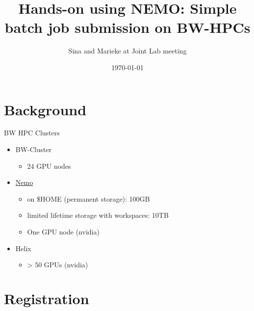 \documentclass{beamer}
\title[Joint lab meeting]{Hands-on using NEMO: Simple batch job submission on BW-HPCs}
\author{Sina and Marieke at Joint Lab meeting}
\date{\today}
\begin{document}
\begin{frame}
  \titlepage
\end{frame}

\section{Background}

\begin{frame}{BW HPC Clusters}

\begin{itemize}
  \item BW-Cluster
  \begin{itemize}
      \item 24 GPU nodes
  \end{itemize}
  \item \href{https://wiki.bwhpc.de/e/NEMO/Hardware#Compute\_and\_Special\_Purpose\_Nodes}{Nemo}
  \begin{itemize}
      \item on \$HOME (permanent storage): 100GB 
      \item limited lifetime storage with workspaces: 10TB  
      \item One GPU node (nvidia)
  \end{itemize}
  \item Helix 
  \begin{itemize}
      \item > 50 GPUs (nvidia)
  \end{itemize}
\end{itemize}

\end{frame}

\section{Registration}
\end{document}
